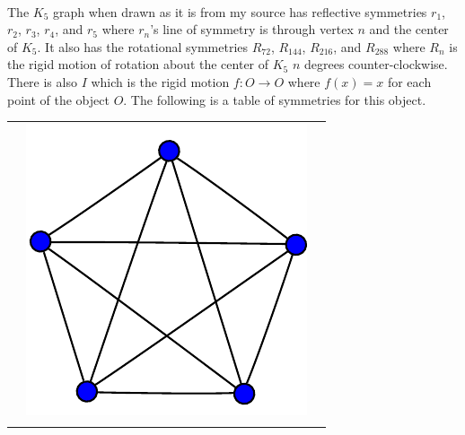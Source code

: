 \documentclass[11pt,a4paper]{article}
\begin{document}
~\\
The $K_5$ graph when drawn as it is from my source has reflective symmetries $r_1$, $r_2$, $r_3$, $r_4$, and $r_5$ where $r_n$'s line of symmetry is through vertex $n$ and the center of $K_5$. It also has the rotational symmetries $R_{72}$, $R_{144}$, $R_{216}$, and $R_{288}$ where $R_n$ is the rigid motion of rotation about the center of $K_5$ $n$ degrees counter-clockwise. There is also $I$ which is the rigid motion $f:O\rightarrow O$ where $f(x)=x$ for each point of the object $O$. The following is a table of symmetries for this object.\\
\begin{center}
\begin{tabular}{ccc}
&\includegraphics[scale=.3]{./graphics/4-simplex_graph.pdf}&\\
&&\\

\end{tabular}
\end{center}
\end{document}
